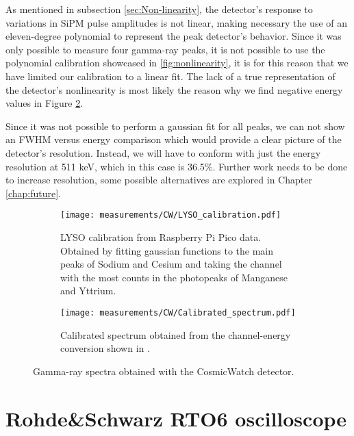 As mentioned in subsection \ref{sec:Non-linearity}, the detector's response to variations in SiPM pulse amplitudes is not linear, making necessary the use of an eleven-degree polynomial to represent the peak detector's behavior. Since it was only possible to measure four gamma-ray peaks, it is not possible to use the polynomial calibration showcased in \ref{fig:nonlinearity}, it is for this reason that we have limited our calibration to a linear fit. The lack of a true representation of the detector's nonlinearity is most likely the reason why we find negative energy values in Figure \ref{sfig:CW_joint_spectra}.

Since it was not possible to perform a gaussian fit for all peaks, we can not show an FWHM versus energy comparison which would provide a clear picture of the detector's resolution. Instead, we will have to conform with just the energy resolution at 511 keV, which in this case is 36.5$\%$. Further work needs to be done to increase resolution, some possible alternatives are explored in Chapter \ref{chap:future}.

\begin{figure}[H]
  \begin{subfigure}[t]{\textwidth}
    \centering
    \texttt{[image: measurements/CW/LYSO\_calibration.pdf]}
    \caption{\label{sfig:CW_LYSO_calibration}LYSO calibration from Raspberry Pi Pico data. Obtained by fitting gaussian functions to the main peaks of Sodium and Cesium and taking the channel with the most counts in the photopeaks of Manganese and Yttrium.}
  \end{subfigure}
  \medskip
  \begin{subfigure}[t]{\textwidth}
    \centering
    \texttt{[image: measurements/CW/Calibrated\_spectrum.pdf]}
    \caption{\label{sfig:CW_joint_spectra}Calibrated spectrum obtained from the channel-energy conversion shown in .}
  \end{subfigure}
  \caption{\label{fig:RS_low_peaks_calibration}Gamma-ray spectra obtained with the CosmicWatch detector.}
\end{figure}

\section{Rohde\&Schwarz RTO6 oscilloscope}\label{sec:RTO6}

